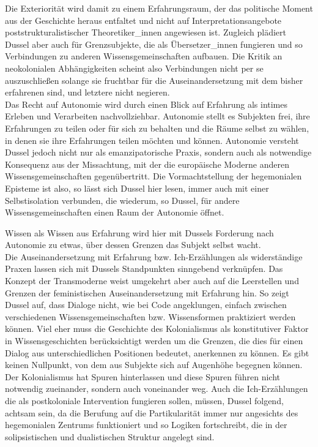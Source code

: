 Die Exteriorität
wird damit zu einem Erfahrungsraum, der das politische Moment aus der Geschichte
heraus entfaltet und nicht auf Interpretationsangebote poststrukturalistischer
Theoretiker\_innen angewiesen ist. Zugleich plädiert Dussel aber auch für
Grenzsubjekte, die als Übersetzer\_innen fungieren und so Verbindungen zu anderen
Wissensgemeinschaften aufbauen. Die Kritik an neokolonialen Abhängigkeiten
scheint also Verbindungen nicht per se auszuschließen solange sie fruchtbar für
die Auseinandersetzung mit dem bisher erfahrenen sind, und letztere nicht
negieren.  
\\
Das Recht auf Autonomie wird durch einen Blick auf Erfahrung als intimes Erleben
und Verarbeiten nachvollziehbar. Autonomie stellt es Subjekten frei, ihre
Erfahrungen zu teilen oder für sich zu behalten und die Räume selbst zu wählen,
in denen sie ihre Erfahrungen teilen möchten und können. Autonomie versteht
Dussel jedoch nicht nur als emanzipatorische Praxis, sondern auch als notwendige
Konsequenz aus der Missachtung, mit der die europäische Moderne anderen
Wissensgemeinschaften gegenübertritt. Die Vormachtstellung der hegemonialen
Episteme ist also, so lässt sich Dussel hier lesen, immer auch mit einer
Selbstisolation verbunden, die wiederum, so Dussel, für andere Wissensgemeinschaften einen Raum der Autonomie öffnet.

Wissen als Wissen aus Erfahrung wird hier mit Dussels Forderung nach Autonomie zu etwas, über dessen Grenzen das Subjekt selbst wacht.
\\
Die Auseinandersetzung mit Erfahrung bzw. Ich-Erzählungen als widerständige
Praxen lassen sich mit Dussels Standpunkten sinngebend verknüpfen. Das Konzept
der Transmoderne weist umgekehrt aber auch auf die Leerstellen und Grenzen der
feministischen Auseinandersetzung mit Erfahrung hin. So zeigt Dussel auf, dass
Dialoge nicht, wie bei Code angeklungen, einfach zwischen verschiedenen
Wissensgemeinschaften bzw. Wissensformen praktiziert werden können. Viel eher
muss die Geschichte des Kolonialismus als konstitutiver Faktor in
Wissensgeschichten berücksichtigt werden um die Grenzen, die dies für einen
Dialog aus unterschiedlichen Positionen bedeutet, anerkennen zu können. Es gibt
keinen Nullpunkt, von dem aus Subjekte sich auf Augenhöhe begegnen können. Der
Kolonialismus hat Spuren hinterlassen und diese Spuren führen nicht notwendig
zueinander, sondern auch voneinander weg. Auch die Ich-Erzählungen die als
postkoloniale Intervention fungieren sollen, müssen, Dussel folgend, achtsam
sein, da die Berufung auf die Partikularität immer nur angesichts des
hegemonialen Zentrums funktioniert und so Logiken fortschreibt, die in der
solipsistischen und dualistischen Struktur angelegt sind.
